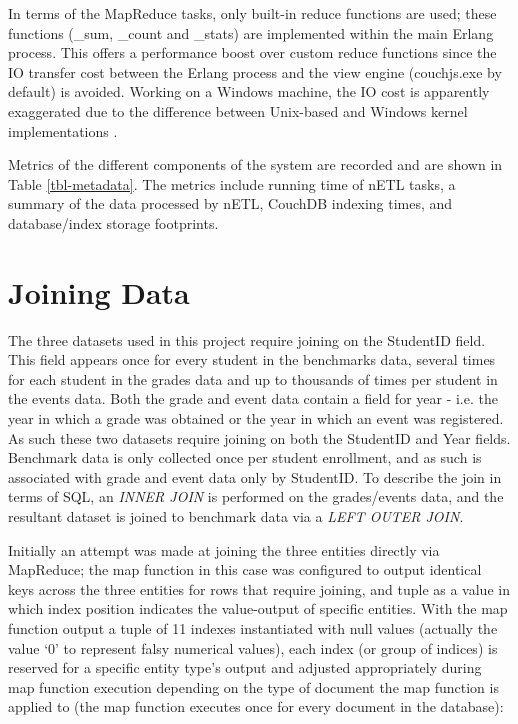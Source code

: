 In terms of the MapReduce tasks, only built-in reduce functions are used; these functions (\_sum, \_count and \_stats) are implemented within the main Erlang process. This offers a performance boost over custom reduce functions since the IO transfer cost between the Erlang process and the view engine (couchjs.exe by default) is avoided. Working on a Windows machine, the IO cost is apparently exaggerated due to the difference between Unix-based and Windows kernel implementations \cite{slack1Nov}.

Metrics of the different components of the system are recorded and are shown in Table \ref{tbl-metadata}. The metrics include running time of nETL tasks, a summary of the data processed by nETL, CouchDB indexing times, and database/index storage footprints.



\section{Joining Data}
The three datasets used in this project require joining on the StudentID field. This field appears once for every student in the benchmarks data, several times for each student in the grades data and up to thousands of times per student in the events data. Both the grade and event data contain a field for year - i.e. the year in which a grade was obtained or the year in which an event was registered. As such these two datasets require joining on both the StudentID and Year fields. Benchmark data is only collected once per student enrollment, and as such is associated with grade and event data only by StudentID. To describe the join in terms of SQL, an \textit{INNER JOIN} is performed on the grades/events data, and the resultant dataset is joined to benchmark data via a \textit{LEFT OUTER JOIN}.

Initially an attempt was made at joining the three entities directly via MapReduce; the map function in this case was configured to output identical keys across the three entities for rows that require joining, and tuple as a value in which index position indicates the value-output of specific entities. With the map function output a tuple of 11 indexes instantiated with null values (actually the value `0' to represent falsy numerical values), each index (or group of indices) is reserved for a specific entity type's output and adjusted appropriately during map function execution depending on the type of document the map function is applied to (the map function executes once for every document in the database):

